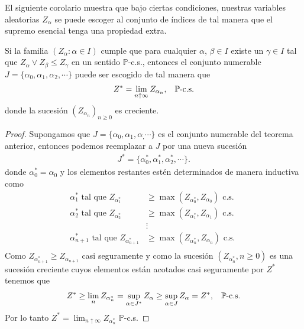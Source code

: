 El siguiente corolario muestra que bajo ciertas condiciones, nuestras variables aleatorias $Z_\alpha$ se puede escoger al conjunto de índices de tal manera que el supremo esencial tenga una propiedad extra. 

\begin{corollary}
\label{coroesssup}
Si la familia $(Z_\alpha : \alpha \in I)$ cumple que para cualquier $\alpha$, $\beta \in I$ existe un $\gamma \in I$ tal que $Z_\alpha \vee Z_\beta \leq Z_\gamma$ en un sentido $\mathbb{P}$-c.s., entonces el conjunto numerable $J = \{\alpha_0, \alpha_1, \alpha_2, \cdots\}$ puede ser escogido de tal manera que
	\begin{align*}
	Z^{*} = \lim_{n \uparrow \infty} Z_{\alpha_n}, \hspace{0.3cm} \mathbb{P}\text{-c.s.}
	\end{align*}
donde la sucesión $( Z_{\alpha_n})_{n \geq 0}$ es creciente.
\end{corollary}
\begin{proof}
Supongamos que $J = \{\alpha_0, \alpha_1, \alpha_, \cdots\}$ es el conjunto numerable del teorema anterior, entonces podemos reemplazar a $J$ por una nueva sucesión
	\begin{align*}
	J^{*} = \{\alpha_0^{*}, \alpha_1^{*}, \alpha_2^{*}, \cdots\}.
	\end{align*}
donde $\alpha_0^{*} = \alpha_0$ y los elementos restantes estén determinados de manera inductiva como
	\begin{align*}
	\alpha_1^{*} \text{ tal que } Z_{\alpha_1^{*}} & \geq \max(Z_{\alpha_0^{*}}, Z_{\alpha_0}) \text{ c.s. } \\
	\alpha_2^{*} \text{ tal que } Z_{\alpha_2^{*}} & \geq \max(Z_{\alpha_1^{*}}, Z_{\alpha_1}) \text{ c.s. } \\
	& \vdots \\
	\alpha_{n+1}^{*} \text{ tal que } Z_{\alpha_{n+1}^{*}} & \geq \max(Z_{\alpha_n^{*}}, Z_{\alpha_n}) \text{ c.s. } \\
	\end{align*}
Como $Z_{\alpha_{n+1}^{*}} \geq Z_{\alpha_{n+1}}$ casi seguramente y como la sucesión $(Z_{\alpha_n^{*}}, n \geq 0)$ es una sucesión creciente cuyos elementos están acotados casi seguramente por $Z^{*}$ tenemos que
	\begin{align*}
	Z^{*} \geq \lim_n Z_{\alpha_n^{*}} = \sup_{\alpha \in J^{*}} Z_\alpha \geq \sup_{\alpha \in J} Z_\alpha = Z^{*}, \hspace{0.3cm} \mathbb{P}\text{-c.s.}
	\end{align*}
Por lo tanto $Z^{*} = \lim_{n \uparrow \infty} Z_{\alpha_n^{*}}$ $\mathbb{P}$-c.s.
\end{proof}

